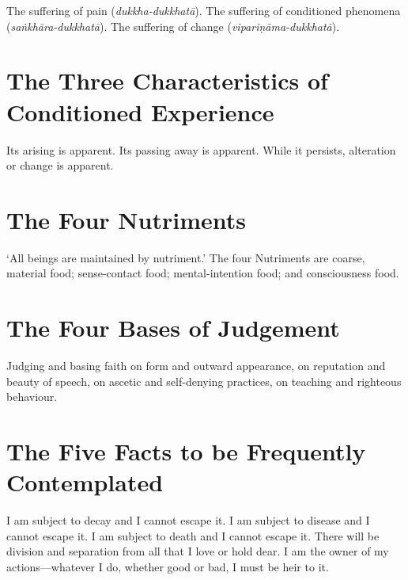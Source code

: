 The suffering of pain (\emph{dukkha-dukkhatā}).
The suffering of conditioned phenomena (\emph{saṅkhāra-dukkhatā}).
The suffering of change (\emph{vipariṇāma-dukkhatā}).\\
\mbox{}

\section*{The Three Characteristics of Conditioned Experience}

Its arising is apparent. Its passing away is apparent. While it persists,
alteration or change is apparent.\\
\mbox{}

\section*{The Four Nutriments}

‘All beings are maintained by nutriment.’ The four Nutriments are coarse,
material food; sense-contact food; mental-intention food; and consciousness
food.\\
\mbox{}

\vspace*{-\baselineskip}

\section*{The Four Bases of Judgement}

Judging and basing faith on form and outward appearance, on reputation and
beauty of speech, on ascetic and self-denying practices, on teaching and
righteous behaviour.\\
\mbox{}

\vspace*{-\baselineskip}

\section*{The Five Facts to be Frequently Contemplated}

I am subject to decay and I cannot escape it. I am subject to disease and I
cannot escape it. I am subject to death and I cannot escape it. There will be
division and separation from all that I love or hold dear. I am the owner of my
actions—whatever I do, whether good or bad, I must be heir to it.\\
\mbox{}

